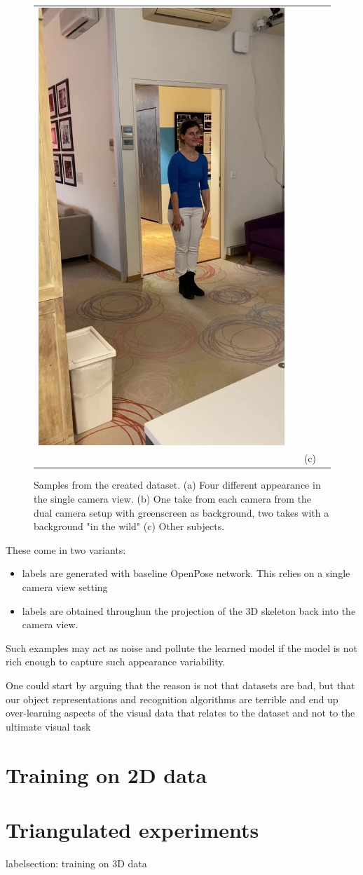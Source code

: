 \begin{figure}
\begin{tabular}{@{}cccc@{}}
  \includegraphics[width=0.187\linewidth]{figures/dataset_images/francesca_office_cloth_blue_phone2.jpg}\\
  & &(c)
  \end{tabular}
  \caption[Samples from the created dataset]{Samples from the created dataset.
      \textup{(a)} Four different appearance in the single camera view.
      \textup{(b)} One take from each camera from the dual camera setup with greenscreen as background, two takes with a background "in the wild"
      \textup{(c)} Other subjects.
    \label{fig: dataset_examples}}
\end{figure}


These come in two variants: 
\begin{itemize}
  \item labels are generated with baseline OpenPose network. This relies on a single camera view setting 
  \item labels are obtained throughun the projection of the 3D skeleton back into the camera view.
\end{itemize}



Such examples may act as noise
and pollute the learned model if the model is not
rich enough to capture such appearance variability.


One
could start by arguing that the reason is not that datasets are
bad, but that our object representations and recognition algorithms are terrible and end up over-learning aspects of the
visual data that relates to the dataset and not to the ultimate
visual task
\section{Training on 2D data}
\label{section: training on 2D data}

\section{Triangulated experiments}
label{section: training on 3D data}


